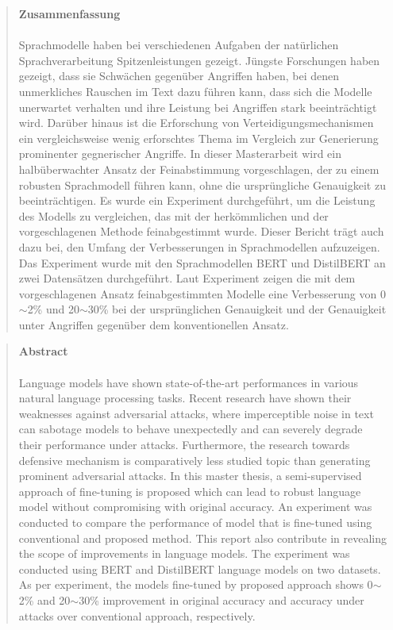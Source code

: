 
\pagestyle{plain}

\begin{quote}
\textbf{\Large Zusammenfassung}\\\\
Sprachmodelle haben bei verschiedenen Aufgaben der natürlichen Sprachverarbeitung Spitzenleistungen gezeigt. Jüngste Forschungen haben gezeigt, dass sie Schwächen gegenüber Angriffen haben, bei denen unmerkliches Rauschen im Text dazu führen kann, dass sich die Modelle unerwartet verhalten und ihre Leistung bei Angriffen stark beeinträchtigt wird. Darüber hinaus ist die Erforschung von Verteidigungsmechanismen ein vergleichsweise wenig erforschtes Thema im Vergleich zur Generierung prominenter gegnerischer Angriffe. In dieser Masterarbeit wird ein halbüberwachter Ansatz der Feinabstimmung vorgeschlagen, der zu einem robusten Sprachmodell führen kann, ohne die ursprüngliche Genauigkeit zu beeinträchtigen. Es wurde ein Experiment durchgeführt, um die Leistung des Modells zu vergleichen, das mit der herkömmlichen und der vorgeschlagenen Methode feinabgestimmt wurde. Dieser Bericht trägt auch dazu bei, den Umfang der Verbesserungen in Sprachmodellen aufzuzeigen.
Das Experiment wurde mit den Sprachmodellen BERT und DistilBERT an zwei Datensätzen durchgeführt.  Laut Experiment zeigen die mit dem vorgeschlagenen Ansatz feinabgestimmten Modelle eine Verbesserung von 0$\sim$2\% und 20$\sim$30\% bei der ursprünglichen Genauigkeit und der Genauigkeit unter Angriffen gegenüber dem konventionellen Ansatz. 

\end{quote}

\newpage

\begin{quote}
	\textbf{\Large Abstract}\\\\
Language models have shown state-of-the-art performances in various natural language  processing tasks. Recent research have shown their weaknesses against adversarial attacks, where imperceptible noise in text can sabotage models to behave unexpectedly and can severely degrade their performance under attacks. Furthermore, the research towards defensive mechanism is comparatively less studied topic than generating prominent adversarial attacks. In this master thesis, a semi-supervised approach of fine-tuning is proposed which can lead to robust language model without compromising with original accuracy. An experiment was conducted to compare the performance of model  that is fine-tuned using conventional and proposed method. This report also contribute in revealing the scope of improvements in language models.
The experiment was conducted using BERT and DistilBERT language models on two datasets.  As per experiment, the models fine-tuned by proposed approach shows  0$\sim$2\% and  20$\sim$30\%  improvement in original accuracy and  accuracy under attacks over conventional approach, respectively. 

\end{quote}
